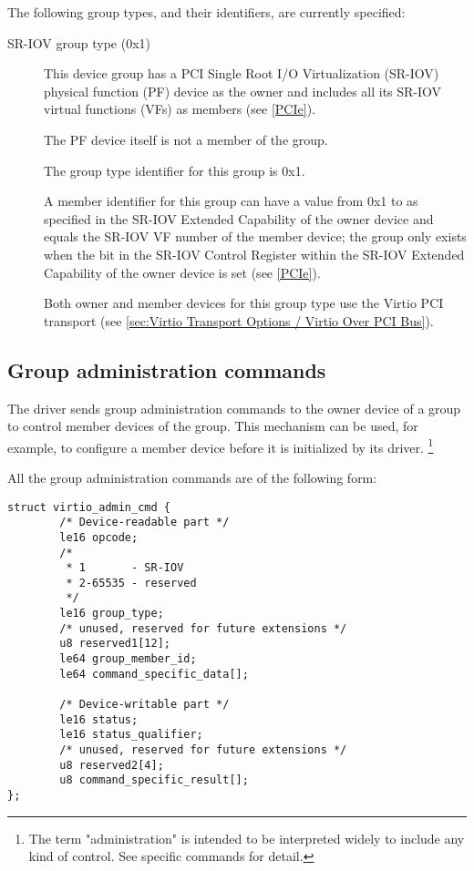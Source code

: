 The following group types, and their identifiers, are currently specified:
\begin{description}
\item[SR-IOV group type (0x1)]
This device group has a PCI Single Root I/O Virtualization
(SR-IOV) physical function (PF) device as the owner and includes
all its SR-IOV virtual functions (VFs) as members (see
\hyperref[intro:PCIe]{[PCIe]}).

The PF device itself is not a member of the group.

The group type identifier for this group is 0x1.

A member identifier for this group can have a value from 0x1 to
 as specified in the
SR-IOV Extended Capability of the owner device
and equals the SR-IOV VF number of the member device;
the group only exists when the  bit
in the SR-IOV Control Register within the
SR-IOV Extended Capability of the owner device is set
(see \hyperref[intro:PCIe]{[PCIe]}).

Both owner and member devices for this group type use the Virtio
PCI transport (see \ref{sec:Virtio Transport Options / Virtio Over PCI Bus}).
\end{description}

\subsection{Group administration commands}\label{sec:Basic Facilities of a Virtio Device / Device groups / Group administration commands}

The driver sends group administration commands to the owner device of
a group to control member devices of the group.
This mechanism can
be used, for example, to configure a member device before it is
initialized by its driver.
\footnote{The term "administration" is intended to be interpreted
widely to include any kind of control. See specific commands
for detail.}

All the group administration commands are of the following form:

\begin{lstlisting}
struct virtio_admin_cmd {
        /* Device-readable part */
        le16 opcode;
        /*
         * 1       - SR-IOV
         * 2-65535 - reserved
         */
        le16 group_type;
        /* unused, reserved for future extensions */
        u8 reserved1[12];
        le64 group_member_id;
        le64 command_specific_data[];

        /* Device-writable part */
        le16 status;
        le16 status_qualifier;
        /* unused, reserved for future extensions */
        u8 reserved2[4];
        u8 command_specific_result[];
};
\end{lstlisting}

